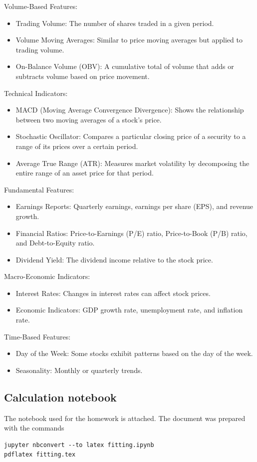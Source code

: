 \documentclass{article}
\begin{document}
Volume-Based Features:

\begin{itemize}
    \item Trading Volume: The number of shares traded in a given period.
    \item Volume Moving Averages: Similar to price moving averages but applied to trading volume.
    \item On-Balance Volume (OBV): A cumulative total of volume that adds or subtracts volume based on price movement.
\end{itemize}

Technical Indicators:

\begin{itemize}
    \item MACD (Moving Average Convergence Divergence): Shows the relationship between two moving averages of a stock’s price.
    \item Stochastic Oscillator: Compares a particular closing price of a security to a range of its prices over a certain period.
    \item Average True Range (ATR): Measures market volatility by decomposing the entire range of an asset price for that period.
\end{itemize}

Fundamental Features:

\begin{itemize}
    \item Earnings Reports: Quarterly earnings, earnings per share (EPS), and revenue growth.
    \item Financial Ratios: Price-to-Earnings (P/E) ratio, Price-to-Book (P/B) ratio, and Debt-to-Equity ratio.
    \item Dividend Yield: The dividend income relative to the stock price.
\end{itemize}

Macro-Economic Indicators:

\begin{itemize}
    \item Interest Rates: Changes in interest rates can affect stock prices.
    \item Economic Indicators: GDP growth rate, unemployment rate, and inflation rate.
\end{itemize}

Time-Based Features:

\begin{itemize}
    \item Day of the Week: Some stocks exhibit patterns based on the day of the week.
    \item Seasonality: Monthly or quarterly trends.
\end{itemize}

\subsection*{Calculation notebook}
The notebook used for the homework is attached.
The document was prepared with the commands
\begin{verbatim}
jupyter nbconvert --to latex fitting.ipynb
pdflatex fitting.tex
\end{verbatim}


\end{document}
